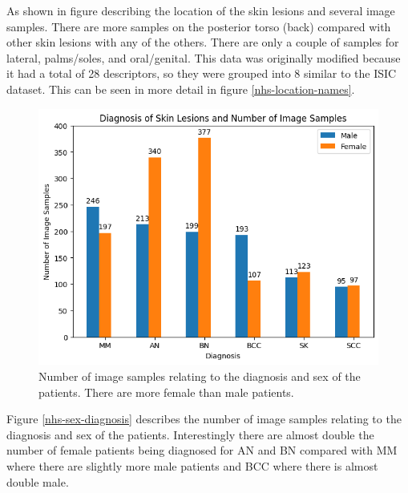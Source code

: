 As shown in figure \cite{nhs-location} describing the location of the skin lesions and several image samples. There are more samples on the posterior torso (back) compared with other skin lesions with any of the others. There are only a couple of samples for lateral, palms/soles, and oral/genital. This data was originally modified because it had a total of 28 descriptors, so they were grouped into 8 similar to the ISIC dataset. This can be seen in more detail in figure \ref{nhs-location-names}.

\begin{figure}
    \centering
    \includegraphics[scale=0.75]{images/nhs/nhs-sex-diagnosis.png}
    \caption{Number of image samples relating to the diagnosis and sex of the patients. There are more female than male patients.} 
\end{figure}\label{nhs-sex-diagnosis}

Figure \ref{nhs-sex-diagnosis} describes the number of image samples relating to the diagnosis and sex of the patients. Interestingly there are almost double the number of female patients being diagnosed for AN and BN compared with MM where there are slightly more male patients and BCC where there is almost double male.

